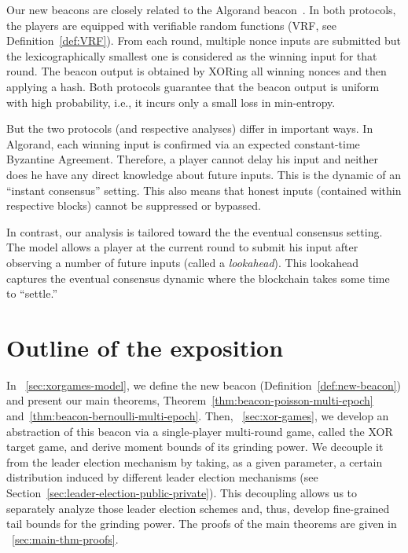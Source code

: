        Our new beacons are closely related to the Algorand beacon~\cite{Algorand}. 
        In both protocols, 
        the players are equipped with verifiable
        random functions (VRF, see Definition~\ref{def:VRF}). 
        From each round, multiple nonce inputs are submitted 
        but the lexicographically smallest one is considered as the winning input for that round.
        The beacon output is obtained by XORing all winning nonces and then applying a hash. 
        Both protocols guarantee that the beacon output 
        is uniform with high probability, i.e., 
        it incurs only a small loss in min-entropy. 

        But the two protocols (and respective analyses) differ in important ways. 
        In Algorand, each winning input is confirmed via 
        an expected constant-time Byzantine Agreement. 
        Therefore, 
        a player cannot delay his input and neither does he have any direct knowledge 
        about future inputs. 
        This is the dynamic of an ``instant consensus'' setting. 
        This also means that honest inputs (contained within respective blocks) 
        cannot be suppressed or bypassed.

        In contrast, our analysis is tailored toward the the eventual consensus setting.
        The model allows a player at the current round to 
        submit his input after observing a number of future inputs 
        (called a \emph{lookahead}). 
        This lookahead captures the eventual consensus dynamic 
        where the blockchain takes some time to ``settle.'' 




\section{Outline of the exposition}
In \Section~\ref{sec:xorgames-model}, 
we define the new beacon (Definition~\ref{def:new-beacon}) and present our main theorems, 
Theorem~\ref{thm:beacon-poisson-multi-epoch} 
and~\ref{thm:beacon-bernoulli-multi-epoch}. 
Then, \Section~\ref{sec:xor-games}, we develop an abstraction of this beacon 
via a single-player multi-round game, called the XOR target game, 
and derive moment bounds of its grinding power. 
We decouple it from the leader election mechanism by taking,
as a given parameter, 
a certain distribution induced by different leader election mechanisms 
(see Section~\ref{sec:leader-election-public-private}). 
This decoupling allows us to separately analyze those leader election schemes 
and, thus, develop fine-grained 
tail bounds for the grinding power. 
The proofs of the main theorems are given in \Section~\ref{sec:main-thm-proofs}.




